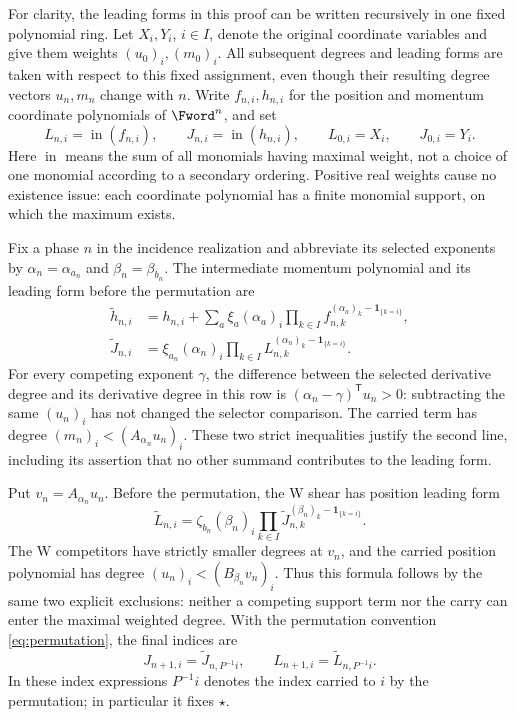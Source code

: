 \documentclass[11pt,letterpaper]{article}
\theoremstyle{definition}
\theoremstyle{remark}
\numberwithin{equation}{section}
\begin{document}
For clarity, the leading forms in this proof can be written recursively in
one fixed polynomial ring.  Let \(X_i,Y_i\), \(i\in I\), denote the original
coordinate variables and give them weights \((u_0)_i,(m_0)_i\).
All subsequent degrees and leading forms are taken with respect to this
fixed assignment, even though their resulting degree vectors \(u_n,m_n\)
change with \(n\).  Write \(f_{n,i},h_{n,i}\) for the position and momentum
coordinate polynomials of \(\Fword^n\), and set
\[
 L_{n,i}=\operatorname{in}(f_{n,i}),\qquad
 J_{n,i}=\operatorname{in}(h_{n,i}),\qquad
 L_{0,i}=X_i,\qquad J_{0,i}=Y_i.
\]
Here \(\operatorname{in}\) means the sum of all monomials having maximal
weight, not a choice of one monomial according to a secondary ordering.
Positive real weights cause no existence issue: each coordinate polynomial
has a finite monomial support, on which the maximum exists.

Fix a phase \(n\) in the incidence realization and abbreviate its selected
exponents by \(\alpha_n=\alpha_{a_n}\) and
\(\beta_n=\beta_{b_n}\).  The intermediate momentum polynomial and its
leading form before the permutation are
\begin{equation}
 \begin{aligned}
 \widetilde h_{n,i}
   &=h_{n,i}+\sum_a \xi_a(\alpha_a)_i
       \prod_{k\in I}f_{n,k}^{(\alpha_a)_k-\mathbf1_{\{k=i\}}},\\
 \widetilde J_{n,i}
   &=\xi_{a_n}(\alpha_n)_i
       \prod_{k\in I}L_{n,k}^{(\alpha_n)_k-\mathbf1_{\{k=i\}}}.
 \end{aligned}
 \label{eq:leading-v-recursion}
\end{equation}
For every competing exponent \(\gamma\), the difference between the
selected derivative degree and its derivative degree in this row is
\((\alpha_n-\gamma)^{\mathsf T}u_n>0\): subtracting the same
\((u_n)_i\) has not changed the selector comparison.  The carried term
has degree \((m_n)_i<(A_{\alpha_n}u_n)_i\).  These two strict
inequalities justify the second line, including its assertion that no
other summand contributes to the leading form.

Put \(v_n=A_{\alpha_n}u_n\).  Before the permutation, the W shear has
position leading form
\begin{equation}
 \widetilde L_{n,i}
   =\zeta_{b_n}(\beta_n)_i
       \prod_{k\in I}\widetilde J_{n,k}^{
                       (\beta_n)_k-\mathbf1_{\{k=i\}}}.
 \label{eq:leading-w-recursion}
\end{equation}
The W competitors have strictly smaller degrees at \(v_n\), and the
carried position polynomial has degree
\((u_n)_i<(B_{\beta_n}v_n)_i\).  Thus this formula follows by the same
two explicit exclusions: neither a competing support term nor the carry
can enter the maximal weighted degree.  With the permutation convention
\eqref{eq:permutation}, the final indices are
\[
 J_{n+1,i}=\widetilde J_{n,P^{-1}i},
 \qquad
 L_{n+1,i}=\widetilde L_{n,P^{-1}i}.
\]
In these index expressions \(P^{-1}i\) denotes the index carried to \(i\)
by the permutation; in particular it fixes \(\star\).
\end{document}
